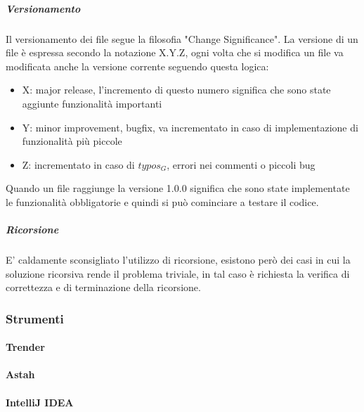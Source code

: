 			\subparagraph{Versionamento}
			Il versionamento dei file segue la filosofia "Change Significance". La versione di un file è espressa secondo la notazione X.Y.Z, ogni volta che si modifica un file va modificata anche la versione corrente seguendo questa logica:			
			\begin{itemize}
				\item X: major release, l'incremento di questo numero significa che sono state aggiunte funzionalità importanti
				\item Y: minor improvement, bugfix, va incrementato in caso di implementazione di funzionalità più piccole
				\item Z: incrementato in caso di $typos_G$, errori nei commenti o piccoli bug
			\end{itemize}
			Quando un file raggiunge la versione 1.0.0 significa che sono state implementate le funzionalità obbligatorie e quindi si può cominciare a testare il codice.

			\subparagraph{Ricorsione}
			E' caldamente sconsigliato l'utilizzo di ricorsione, esistono però dei casi in cui la soluzione ricorsiva rende il problema triviale, in tal caso è richiesta la verifica di correttezza e di terminazione della ricorsione.
	\subsubsection{Strumenti}
		\paragraph{Trender}
		\paragraph{Astah}
		\paragraph{IntelliJ IDEA}
			
			

